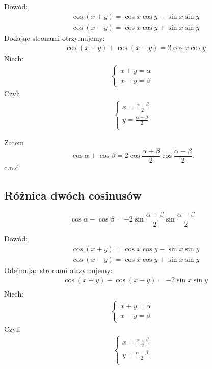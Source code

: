 \documentclass[12pt,a4paper,fleqn]{article}
\begin{document}
		\underline{Dowód:} \noindent
		\begin{align*}
			&\cos(x+y) = \cos x \cos y - \sin x \sin y\\
			&\cos(x-y) = \cos x \cos y + \sin x \sin y
		\end{align*}
			Dodając stronami otrzymujemy:
		\begin{align*}
			&\cos(x+y) + \cos(x-y) = 2\cos x \cos y
		\end{align*}
		Niech:
		\begin{align*}
		\begin{cases}
			x+y = \alpha\\
			x-y = \beta
		\end{cases}
		\end{align*}
		Czyli
		\begin{align*}
		\begin{cases}
		 	x = \frac{\alpha+\beta}{2}\\
		 	y = \frac{\alpha-\beta}{2}\\
		\end{cases}
		\end{align*}
		
		Zatem
		\begin{equation*}
			\cos\alpha + \cos \beta =2\cos\frac{\alpha+\beta}{2}\cos\frac{\alpha-\beta}{2}.
		\end{equation*}
	c.n.d.

	\subsection{Różnica dwóch cosinusów}
		\begin{equation*}
			\cos\alpha - \cos \beta =-2\sin\frac{\alpha+\beta}{2}\sin\frac{\alpha-\beta}{2} 
		\end{equation*}
		
		\underline{Dowód:} \noindent
		\begin{align*}
			&\cos(x+y) = \cos x \cos y - \sin x \sin y\\
			&\cos(x-y) = \cos x \cos y + \sin x \sin y
		\end{align*}
			Odejmując stronami otrzymujemy:
		\begin{align*}
			&\cos(x+y) - \cos(x-y) = - 2\sin x \sin y\\
		\end{align*}
		Niech:
		\begin{align*}
		\begin{cases}
			x+y = \alpha\\
			x-y = \beta
		\end{cases}
		\end{align*}
		Czyli
		\begin{align*}
		\begin{cases}
		 	x = \frac{\alpha+\beta}{2}\\
		 	y = \frac{\alpha-\beta}{2}\\
		\end{cases}
		\end{align*}
		
\end{document}
